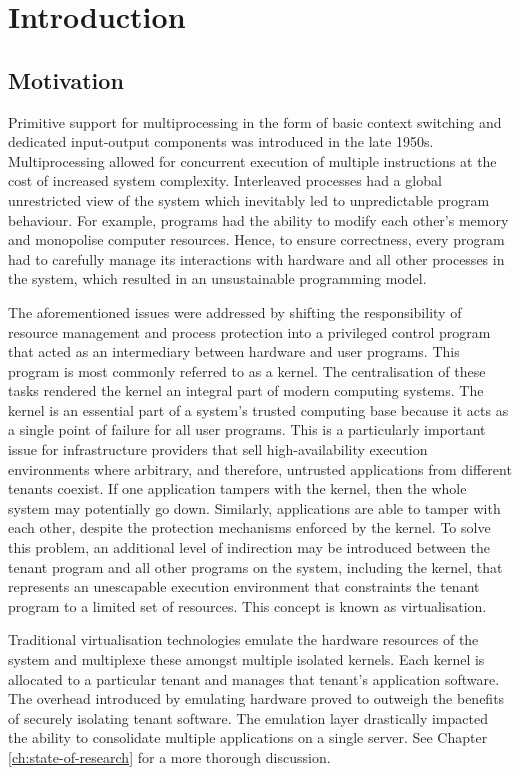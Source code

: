 \chapter{Introduction}
\section{Motivation}
Primitive support for multiprocessing in the form of basic context switching and dedicated input-output 
components was introduced in the late 1950s. Multiprocessing allowed for concurrent execution of 
multiple instructions at the cost of increased system complexity. Interleaved processes had a 
global unrestricted view of the system which inevitably led to unpredictable program behaviour. 
For example, programs had the ability to modify each other's memory and monopolise 
computer resources. Hence, to ensure correctness, every program had to carefully manage its interactions 
with hardware and all other processes in the system, which resulted in an unsustainable 
programming model.

The aforementioned issues were addressed by shifting the responsibility of resource management 
and process protection into a privileged control program that acted as an intermediary between 
hardware and user programs. This program is most commonly referred to as a kernel.
The centralisation of these tasks rendered the kernel an integral part of modern computing systems. 
The kernel is an essential part of a system's trusted computing base because it acts as a 
single point of failure for all user programs. This is a particularly important issue for 
infrastructure providers that sell high-availability execution environments where 
arbitrary, and therefore, untrusted applications from different tenants coexist.
If one application tampers with the kernel, then the whole system may potentially go down. 
Similarly, 
applications are able to tamper with each other, despite the protection mechanisms enforced 
by the kernel. To solve this problem, an additional level of indirection may be introduced between the tenant program
and all other programs on the system, including the kernel, that represents an unescapable 
execution environment that constraints the tenant program to a limited set of resources.
This concept is known as virtualisation. 

Traditional virtualisation technologies emulate the hardware resources of the system 
and multiplexe these amongst multiple isolated kernels.
Each kernel is allocated to a particular tenant and manages that tenant's application software.
The overhead introduced by emulating hardware proved to outweigh the benefits of securely isolating 
tenant software. The emulation layer drastically impacted the ability to consolidate multiple applications 
on a single server. See Chapter \ref{ch:state-of-research} for a more thorough discussion.

